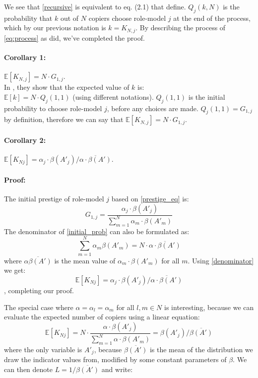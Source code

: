 \documentclass[11pt]{article}
\begin{document}
We see that \cref{recursive} is equivalent to eq. (2.1) that \citet{GBD} define.
$Q_j(k,N)$ is the probability that $k$ out of $N$ copiers choose role-model $j$ at the end of the process, which by our previous notation is $k=K_{N,j}$.
By describing the process of \cref{eq:process} as \citep{GBD} did, we've completed the proof.

\paragraph{Corollary 1: } $\mathbb{E}[K_{N,j}] = N \cdot G_{1,j}$.\\
In \citep[equation 2.3]{GBD}, they show that the expected value of $k$ is: \\
$\mathbb{E}[k] = N \cdot Q_j(1,1)$ (using different notations).
$Q_j(1,1)$ is the initial probability to choose role-model $j$, before any choices are made.
$Q_j(1,1) = G_{1,j}$ by definition, therefore we can say that $\mathbb{E}[K_{N,j}]=N \cdot G_{1,j}$.\\

\paragraph{Corollary 2: } $\mathbb{E}[K_{Nj}] = \alpha_j \cdot \beta(A'_j) / \overline{\alpha \cdot \beta(A')}$.
\paragraph{Proof: } The initial prestige of role-model $j$ based on \cref{prestige_eq} is:
\begin{equation}\label{initial_prob}
G_{1,j} = \frac{\alpha_j\cdot\beta(A'_j)}{\sum\limits_{m=1}^{N}\alpha_m\cdot\beta(A'_m)}
\end{equation}
The denominator of \cref{initial_prob} can also be formulated as:
\begin{equation}\label{denominator}
 \sum\limits_{m=1}^{N}\alpha_m\beta(A'_m) = N \cdot \overline{\alpha \cdot \beta(A')}
\end{equation}
where $\overline{\alpha\beta(A')}$ is the mean value of $\alpha_m\cdot\beta(A'_m)$ for all $m$.
Using \cref{denominator} we get:
\begin{equation}
\mathbb{E}[K_{Nj}] = \alpha_j \cdot \beta(A'_j) \bigg/ \overline{\alpha \cdot \beta(A')}
\end{equation},
completing our proof.

The special case where $\alpha = \alpha_l=\alpha_m$ for all $l,m \in N$ is interesting, because we can evaluate the expected number of copiers using a linear equation:
\begin{equation}
\mathbb{E}[K_{Nj}]= N\cdot\frac{\alpha\cdot\beta(A'_j)}{\sum\limits_{m=1}^{N}\alpha\cdot\beta(A'_m)} =\beta(A'_j) \bigg/ \overline{\beta(A')}
\end{equation}
where the only variable is $A'_j$, because $\overline{\beta(A')}$ is the mean of the distribution we draw the indicator values from, modified by some constant parameters of $\beta$.
We can then denote $L = 1/\overline{\beta(A')}$ and write:
\end{document}
